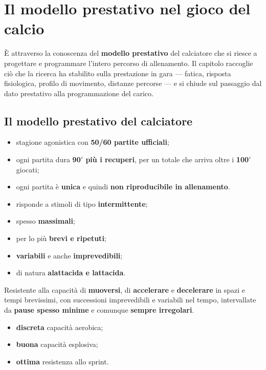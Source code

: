 \chapter{Il modello prestativo nel gioco del calcio}
\label{cap:modelloprestativo}

È attraverso la conoscenza del \textbf{modello prestativo} del calciatore che si riesce a progettare
e programmare l'intero percorso di allenamento. Il capitolo raccoglie ciò che la ricerca ha
stabilito sulla prestazione in gara --- fatica, risposta fisiologica, profilo di movimento, distanze
percorse --- e si chiude sul passaggio dal dato prestativo alla programmazione del carico.

\section{Il modello prestativo del calciatore}

\begin{itemize}
  \item stagione agonistica con \textbf{50/60 partite ufficiali};
  \item ogni partita dura \textbf{90$'$ più i recuperi}, per un totale che arriva oltre i
    \textbf{100$'$} giocati;
  \item ogni partita è \textbf{unica} e quindi \textbf{non riproducibile in allenamento}.
\end{itemize}

\begin{itemize}
  \item risponde a stimoli di tipo \textbf{intermittente};
  \item spesso \textbf{massimali};
  \item per lo più \textbf{brevi e ripetuti};
  \item \textbf{variabili} e anche \textbf{imprevedibili};
  \item di natura \textbf{alattacida e lattacida}.
\end{itemize}

Resistente alla capacità di \textbf{muoversi}, di \textbf{accelerare} e \textbf{decelerare} in spazi
e tempi brevissimi, con successioni imprevedibili e variabili nel tempo, intervallate da
\textbf{pause spesso minime} e comunque \textbf{sempre irregolari}.

\begin{itemize}
  \item \textbf{discreta} capacità aerobica;
  \item \textbf{buona} capacità esplosiva;
  \item \textbf{ottima} resistenza allo sprint.
\end{itemize}

